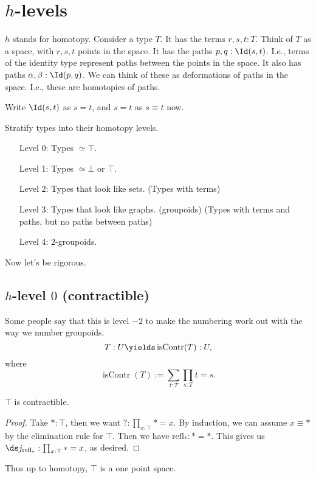 \documentclass{article}
\newcommand\pred[1]{\operatorname{#1}}
\newcommand\refl{\mathrm{refl}}
\newcommand\isContr{\pred{isContr}}
\begin{document}
\section{$h$-levels}

$h$ stands for homotopy. Consider a type $T$.
It has the terms $r,s,t:T$. Think of $T$ as a space, with 
$r,s,t$ points in the space.
It has the paths $p,q:\Id(s,t)$. I.e., terms of the identity type 
represent paths between the points in the space.
It also has paths $\alpha,\beta : \Id(p,q)$. We can think of these
as deformations of paths in the space. I.e., these are 
homotopies of paths.

Write $\Id(s,t)$ as $s=t$, and $s=t$ as $s\equiv t$ now.

Stratify types into their homotopy levels.
\begin{enumerate}
    \item[Level 0:] Types $\simeq \top$.
    \item[Level 1:] Types $\simeq \bot$ or $\top$.
    \item[Level 2:] Types that look like sets. (Types with terms)
    \item[Level 3:] Types that look like graphs. (groupoids) (Types with terms and paths, but no paths between paths)
    \item[Level 4:] $2$-groupoids. 
\end{enumerate}

Now let's be rigorous.

\subsection{$h$-level $0$ (contractible)}

Some people say that this is level $-2$ to make the numbering work out 
with the way we number groupoids. 
\[T:U\yields \isContr(T):U,\]
where 
\[\isContr(T) := \sum_{t:T} \prod_{s:T} t=s. \]

\begin{proposition}
    $\top$ is contractible.
\end{proposition}

\begin{proof}
    Take $*:\top$, then we want $?:\prod_{x:\top} *=x$.
    By induction, we can assume $x\equiv *$ by the elimination 
    rule for $\top$. Then we have $\refl_* : *=*$.
    This gives us $\ds j_{\refl_*} : \prod_{x:\top} *=x$, as 
    desired.
\end{proof}

Thus up to homotopy, $\top$ is a one point space.
\end{document}
